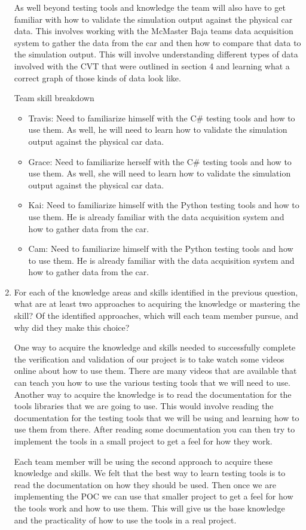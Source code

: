 \documentclass[12pt, titlepage]{article}
\begin{document}
\begin{enumerate}
  As well beyond testing tools and knowledge the team will also have to get familiar with how to validate the simulation output against the physical car data. 
  This involves working with the McMaster Baja teams data acquisition system to gather the data from the car and then how to compare that data to the simulation output.
  This will involve understanding different types of data involved with the CVT that were outlined in section 4 and learning what a correct graph of those kinds of data look like.
  
  Team skill breakdown
  \begin{itemize}
    \item Travis: Need to familiarize himself with the C\# testing tools and how to use them. As well, he will need to learn how to validate the simulation output against the physical car data.
    \item Grace: Need to familiarize herself with the C\# testing tools and how to use them. As well, she will need to learn how to validate the simulation output against the physical car data.
    \item Kai: Need to familiarize himself with the Python testing tools and how to use them. He is already familiar with the data acquisition system and how to gather data from the car.
    \item Cam: Need to familiarize himself with the Python testing tools and how to use them. He is already familiar with the data acquisition system and how to gather data from the car.
  \end{itemize}
  \item For each of the knowledge areas and skills identified in the previous
  question, what are at least two approaches to acquiring the knowledge or
  mastering the skill?  Of the identified approaches, which will each team
  member pursue, and why did they make this choice?

  One way to acquire the knowledge and skills needed to successfully complete the verification and validation of our project is to take watch some videos online about how to use them.
  There are many videos that are available that can teach you how to use the various testing tools that we will need to use.
  Another way to acquire the knowledge is to read the documentation for the tools libraries that we are going to use.
  This would involve reading the documentation for the testing tools that we will be using and learning how to use them from there.
  After reading some documentation you can then try to implement the tools in a small project to get a feel for how they work.

  Each team member will be using the second approach to acquire these knowledge and skills. 
  We felt that the best way to learn testing tools is to read the documentation on how they should be used.
  Then once we are implementing the POC we can use that smaller project to get a feel for how the tools work and how to use them.
  This will give us the base knowledge and the practicality of how to use the tools in a real project.
\end{enumerate}
\end{document}
